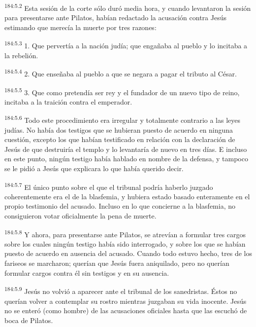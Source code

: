 \par
\textsuperscript{184:5.2} Esta sesión de la corte sólo duró media hora, y cuando levantaron la sesión para presentarse ante Pilatos, habían redactado la acusación contra Jesús estimando que merecía la muerte por tres razones:

\par
\textsuperscript{184:5.3} 1. Que pervertía a la nación judía; que engañaba al pueblo y lo incitaba a la rebelión.

\par
\textsuperscript{184:5.4} 2. Que enseñaba al pueblo a que se negara a pagar el tributo al César.

\par
\textsuperscript{184:5.5} 3. Que como pretendía ser rey y el fundador de un nuevo tipo de reino, incitaba a la traición contra el emperador.

\par
\textsuperscript{184:5.6} Todo este procedimiento era irregular y totalmente contrario a las leyes judías. No había dos testigos que se hubieran puesto de acuerdo en ninguna cuestión, excepto los que habían testificado en relación con la declaración de Jesús de que destruiría el templo y lo levantaría de nuevo en tres días. E incluso en este punto, ningún testigo había hablado en nombre de la defensa, y tampoco se le pidió a Jesús que explicara lo que había querido decir.

\par
\textsuperscript{184:5.7} El único punto sobre el que el tribunal podría haberlo juzgado coherentemente era el de la blasfemia, y hubiera estado basado enteramente en el propio testimonio del acusado. Incluso en lo que concierne a la blasfemia, no consiguieron votar oficialmente la pena de muerte.

\par
\textsuperscript{184:5.8} Y ahora, para presentarse ante Pilatos, se atrevían a formular tres cargos sobre los cuales ningún testigo había sido interrogado, y sobre los que se habían puesto de acuerdo en ausencia del acusado. Cuando todo estuvo hecho, tres de los fariseos se marcharon; querían que Jesús fuera aniquilado, pero no querían formular cargos contra él sin testigos y en su ausencia.

\par
\textsuperscript{184:5.9} Jesús no volvió a aparecer ante el tribunal de los sanedristas. Éstos no querían volver a contemplar su rostro mientras juzgaban su vida inocente. Jesús no se enteró (como hombre) de las acusaciones oficiales hasta que las escuchó de boca de Pilatos.

